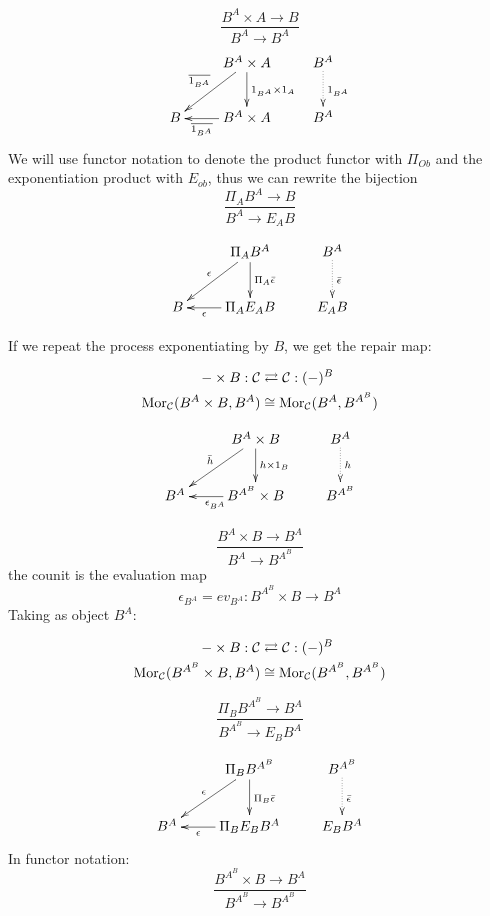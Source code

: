 \documentclass[aps,twocolumn]{revtex4-1}
\begin{document}
	$$
			\frac{B^A \times A \longrightarrow B}{B^A \longrightarrow B^A}
		$$
				$$
			\xymatrix{
			& B^A \times A \ar[d]^{1_{B^A} \times 1_A} \ar[dl]_{\overline{1_{B^A}}} & B^A \ar@{.>}[d]^{1_{B^A}}\\
			B & B^A \times A \ar[l]^-{\overline{1_{B^A}}} & B^A}
			$$
We will use functor notation to denote the product functor with $\Pi_{Ob}$ and the exponentiation product with $E_{ob}$, thus we can rewrite the bijection
		$$
			\frac{ \Pi_A B^A \longrightarrow B}{B^A \longrightarrow E_A B}
		$$

			$$
			\xymatrix{
			& \Pi_A B^A \ar[d]^{\Pi_A \bar{\epsilon}} \ar[dl]_{\epsilon} & B^A \ar@{.>}[d]^{\bar{\epsilon}}\\
			B & \Pi_A E_A B \ar[l]^-{\epsilon} & E_A B}
			$$
	
If we repeat the process exponentiating by $B$, we get the repair map:	
	
\begin{align*}
- \times B: \mathcal{C} & \rightleftarrows \mathcal{C}: (-)^B\\
\mathop{\rm Mor}\nolimits_{\mathcal{C}}(B^A \times B, B^A) & \cong  \mathop{\rm Mor}\nolimits_{\mathcal{C}}(B^A, B^{A^B})
\end{align*}

			$$ \xymatrix{
			& B^A \times B \ar[d]^-{h \times 1_B} \ar[dl]_{\bar{h}} & B^A \ar@{.>}[d]^-{h}\\
			B^A & B^{A^B} \times B \ar[l]^{\epsilon_{B^A}} & B^{A^B}}
			$$
		
		$$
			\frac{B^A \times B \longrightarrow B^A}{B^A \longrightarrow B^{A^B}}
		$$
		the counit is the evaluation map
		$$
			\epsilon_{B^A} = ev_{B^A} \colon B^{A^B} \times B \longrightarrow B^A
		$$
Taking as object $B^A$:

\begin{align*}
- \times B: \mathcal{C} & \rightleftarrows \mathcal{C}: (-)^B\\
\mathop{\rm Mor}\nolimits_{\mathcal{C}}(B^{A^B} \times B, B^A) & \cong  \mathop{\rm Mor}\nolimits_{\mathcal{C}}(B^{A^B}, B^{A^B})
\end{align*}

		$$
			\frac{ \Pi_B B^{A^B} \longrightarrow B^A}{B^{A^B} \longrightarrow E_B B^A}
		$$

			$$
			\xymatrix{
			& \Pi_B B^{A^B} \ar[d]^{\Pi_B \bar{\epsilon}} \ar[dl]_{\epsilon} & B^{A^B} \ar@{.>}[d]^{\bar{\epsilon}}\\
			B^A & \Pi_B E_B B^A \ar[l]^-{\epsilon} & E_B B^A}
			$$
In functor notation:
		$$
			\frac{B^{A^B} \times B \longrightarrow B^A}{B^{A^B} \longrightarrow B^{A^B}}
		$$
\end{document}
